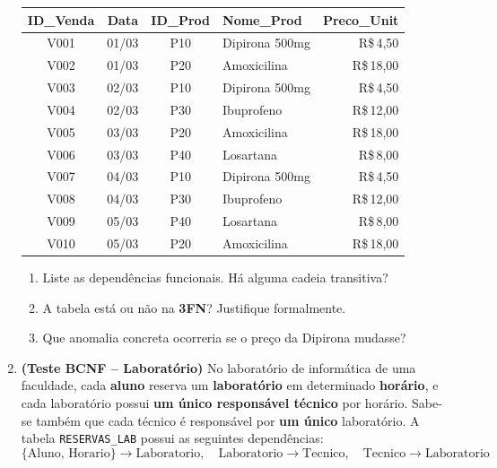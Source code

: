 \documentclass[12pt]{article}
\begin{document}
\begin{enumerate}[label=\textbf{Questão \arabic*:}, leftmargin=*]
  \vspace{0.2cm}
  \centering
  \begin{tabular}{|c|c|c|l|r|}
    \hline
    \textbf{ID\_Venda} & \textbf{Data} & \textbf{ID\_Prod} & \textbf{Nome\_Prod} & \textbf{Preco\_Unit} \\ \hline
    V001 & 01/03 & P10 & Dipirona 500mg & R\$\,4,50  \\ \hline
    V002 & 01/03 & P20 & Amoxicilina    & R\$\,18,00 \\ \hline
    V003 & 02/03 & P10 & Dipirona 500mg & R\$\,4,50  \\ \hline
    V004 & 02/03 & P30 & Ibuprofeno     & R\$\,12,00 \\ \hline
    V005 & 03/03 & P20 & Amoxicilina    & R\$\,18,00 \\ \hline
    V006 & 03/03 & P40 & Losartana      & R\$\,8,00  \\ \hline
    V007 & 04/03 & P10 & Dipirona 500mg & R\$\,4,50  \\ \hline
    V008 & 04/03 & P30 & Ibuprofeno     & R\$\,12,00 \\ \hline
    V009 & 05/03 & P40 & Losartana      & R\$\,8,00  \\ \hline
    V010 & 05/03 & P20 & Amoxicilina    & R\$\,18,00 \\ \hline
  \end{tabular}
  \flushleft
  \vspace{0.2cm}
  \begin{enumerate}[label=\alph*)]
    \item Liste as dependências funcionais. Há alguma cadeia transitiva?
    \item A tabela está ou não na \textbf{3FN}? Justifique formalmente.
    \item Que anomalia concreta ocorreria se o preço da Dipirona mudasse?
  \end{enumerate}


  \vspace{0.4cm}

  \item 
  \textbf{(Teste BCNF -- Laboratório)} No laboratório de informática de uma faculdade, cada \textbf{aluno} reserva um \textbf{laboratório} em determinado \textbf{horário}, e cada laboratório possui \textbf{um único responsável técnico} por horário. Sabe-se também que cada técnico é responsável por \textbf{um único} laboratório. A tabela \texttt{RESERVAS\_LAB} possui as seguintes dependências:
  \[
    \{\text{Aluno, Horario}\} \to \text{Laboratorio}, \quad
    \text{Laboratorio} \to \text{Tecnico}, \quad
    \text{Tecnico} \to \text{Laboratorio}
  \]


\end{enumerate}
\end{document}
